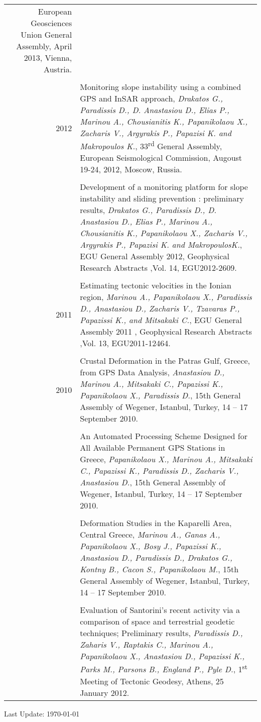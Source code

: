 \documentclass[9pt]{extarticle} %
\begin{document}
\begin{longtable}{r|p{14cm}}
  European Geosciences Union General Assembly, April 2013, Vienna, Austria.\\
%
\multicolumn{2}{c}{} \\
  \textsc{2012}
  & Monitoring slope instability using a combined GPS and InSAR approach,
  \emph{Drakatos G., Paradissis D., D. Anastasiou D., Elias P., Marinou A., Chousianitis K., Papanikolaou X., Zacharis V., Argyrakis P., Papazisi K. and Makropoulos K.},
  33\textsuperscript{rd} General Assembly, European Seismological Commission, Augoust 19-24, 2012, Moscow, Russia.\\
%
  &\\
%
  & Development of a monitoring platform for slope instability and sliding prevention : preliminary results,
  \emph{Drakatos G., Paradissis D., D. Anastasiou D., Elias P., Marinou A., Chousianitis K., Papanikolaou X., Zacharis V., Argyrakis P., Papazisi K. and MakropoulosK.},
  EGU General Assembly 2012, Geophysical Research Abstracts ,Vol. 14, EGU2012-2609.\\
%
\multicolumn{2}{c}{} \\
  \textsc{2011}
  & Estimating tectonic velocities in the Ionian region, 
  \emph{Marinou Α., Papanikolaou X., Paradissis D., Anastasiou D., Zacharis V., Tzavaras P., Papazissi K., and Mitsakaki C.},
  EGU General Assembly 2011 , Geophysical Research Abstracts ,Vol. 13, EGU2011-12464.\\
%
\multicolumn{2}{c}{} \\
  \textsc{2010}
  & Crustal Deformation in the Patras Gulf, Greece, from GPS Data Analysis,
  \emph{Anastasiou D., Marinou A., Mitsakaki C., Papazissi K., Papanikolaou X., Paradissis D.},
  15th General Assembly of Wegener, Istanbul, Turkey, 14 – 17 September 2010.\\
%
  &\\
%
  & An Automated Processing Scheme Designed for All Available Permanent GPS Stations in Greece,
  \emph{Papanikolaou X., Marinou A., Mitsakaki C., Papazissi K., Paradissis D., Zacharis V., Anastasiou D.},
  15th General Assembly of Wegener, Istanbul, Turkey, 14 – 17 September 2010.\\
%
  &\\
%
  & Deformation Studies in the Kaparelli Area, Central Greece,
  \emph{Marinou A., Ganas A., Papanikolaou X., Bosy J., Papazissi K., Anastasiou D., Paradissis D., Drakatos G., Kontny B., Cacon S., Papanikolaou M.},
  15th General Assembly of Wegener, Istanbul, Turkey, 14 – 17 September 2010.\\
%
  &\\
%
  & Evaluation of Santorini's recent activity via a comparison of space and terrestrial geodetic techniques; Preliminary results,
  \emph{Paradissis D., Zaharis V., Raptakis C., Marinou A., Papanikolaou X., Anastasiou D., Papazissi K., Parks M., Parsons B., England P., Pyle D.},
  1\textsuperscript{st} Meeting of Tectonic Geodesy, Athens, 25 January 2012.\\
%
\end{longtable}

\vfill
\begin{center}
  \begin{footnotesize}
    Last Update: \today
  \end{footnotesize}
\end{center}
\end{document}
